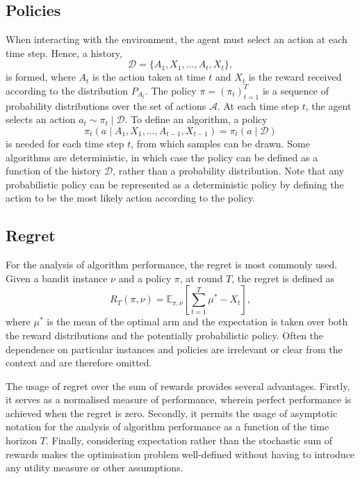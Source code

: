 \subsection{Policies}
When interacting with the environment, the agent must select an action at each time step.
Hence, a history,
\begin{equation}
    \mathcal{D} = \{A_1, X_1, \dots, A_t, X_t\},
\end{equation}
is formed, where $A_t$ is the action taken at time $t$ and $X_t$ is the reward received according to the distribution $P_{A_t}$.
The policy $\pi = (\pi_t)_{t=1}^T$ is a sequence of probability distributions over the set of actions $\mathcal{A}$.
At each time step $t$, the agent selects an action $a_t \sim \pi_t \mid \mathcal{D}$.
To define an algorithm, a policy
\begin{equation}
    \pi_t(a \mid A_1, X_1, \dots, A_{t-1}, X_{t-1}) = \pi_t(a \mid \mathcal{D})
\end{equation}
is needed for each time step $t$, from which samples can be drawn.
Some algorithms are deterministic, in which case the policy can be defined as a function of the history $\mathcal{D}$, rather than a probability distribution.
Note that any probabilistic policy can be represented as a deterministic policy by defining the action to be the most likely action according to the policy.

\subsection{Regret}
For the analysis of algorithm performance, the regret is most commonly used.
Given a bandit instance $\nu$ and a policy $\pi$, at round $T$, the regret is defined as
\begin{equation}
    R_T(\pi, \nu) = \mathbb{E}_{\pi, \nu}\left[\sum_{t=1}^T \mu^* - X_t\right],
    \label{eq:regret1}
\end{equation}
where $\mu^*$ is the mean of the optimal arm and the expectation is taken over both the reward distributions and the potentially probabilistic policy.
Often the dependence on particular instances and policies are irrelevant or clear from the context and are therefore omitted.

The usage of regret over the sum of rewards provides several advantages.
Firstly, it serves as a normalised measure of performance, wherein perfect performance is achieved when the regret is zero.
Secondly, it permits the usage of asymptotic notation for the analysis of algorithm performance as a function of the time horizon $T$.
Finally, considering expectation rather than the stochastic sum of rewards makes the optimisation problem well-defined without having to introduce any utility measure or other assumptions.

